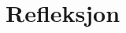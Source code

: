 \documentclass[main.tex]{subfiles}
\begin{document}
\section*{Refleksjon}
\label{sec:2}
\end{document}
